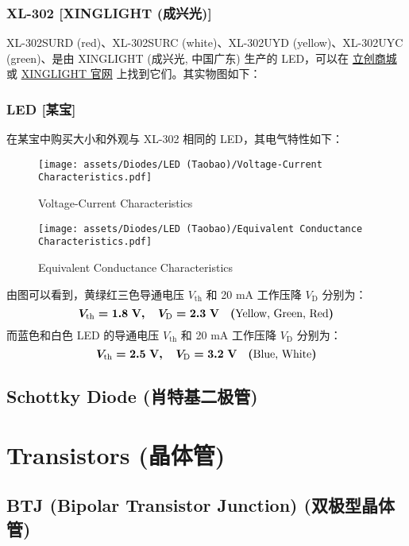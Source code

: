 \documentclass[UTF8]{report}
\begin{document}
\subsection{XL-302 [XINGLIGHT (成兴光)]}
XL-302SURD (red)、XL-302SURC (white)、XL-302UYD (yellow)、XL-302UYC (green)、是由 XINGLIGHT (成兴光, 中国广东) 生产的 LED，可以在 \href{https://so.szlcsc.com/global.html?k=XL-302U}{立创商城} 或 \href{http://www.xinglight.cn/index.php?s=cpzx&c=search&keyword=XL-302}{XINGLIGHT 官网} 上找到它们。其实物图如下：

\subsection{LED [某宝]}
在某宝中购买大小和外观与 XL-302 相同的 LED，其电气特性如下：
\begin{figure}[H]\centering
    \texttt{[image: assets/Diodes/LED (Taobao)/Voltage-Current Characteristics.pdf]}
    \caption{Voltage-Current Characteristics}
\end{figure}
\begin{figure}[H]\centering
    \texttt{[image: assets/Diodes/LED (Taobao)/Equivalent Conductance Characteristics.pdf]}
    \caption{Equivalent Conductance Characteristics}
\end{figure}
由图可以看到，黄绿红三色导通电压 $V_\text{th}$ 和 20 mA 工作压降 $V_\text{D}$ 分别为：
\begin{equation}
\boldmath
V_\text{th} = 1.8 \ \mathrm{V},\quad V_\text{D} = 2.3 \ \mathrm{V} \quad (\text{Yellow, Green, Red})
\end{equation}
而蓝色和白色 LED 的导通电压 $V_\text{th}$ 和 20 mA 工作压降 $V_\text{D}$ 分别为：
\begin{equation}
\boldmath
V_\text{th} = 2.5 \ \mathrm{V},\quad V_\text{D} = 3.2 \ \mathrm{V} \quad (\text{Blue, White})
\end{equation}

\section{Schottky Diode (肖特基二极管)}

\chapter{Transistors (晶体管)}\thispagestyle{fancy}
\section{BTJ (Bipolar Transistor Junction) (双极型晶体管)}
\end{document}
